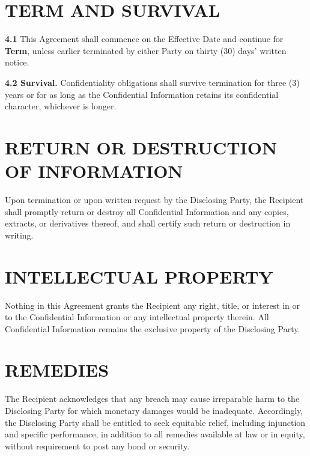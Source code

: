 \documentclass[10pt]{article}
\begin{document}
\section{TERM AND SURVIVAL}

\textbf{4.1} This Agreement shall commence on the Effective Date and continue for \textbf{{{Term}}}, unless earlier terminated by either Party on thirty (30) days' written notice.

\textbf{4.2 Survival.} Confidentiality obligations shall survive termination for three (3) years or for as long as the Confidential Information retains its confidential character, whichever is longer.

\section{RETURN OR DESTRUCTION OF INFORMATION}

Upon termination or upon written request by the Disclosing Party, the Recipient shall promptly return or destroy all Confidential Information and any copies, extracts, or derivatives thereof, and shall certify such return or destruction in writing.

\section{INTELLECTUAL PROPERTY}

Nothing in this Agreement grants the Recipient any right, title, or interest in or to the Confidential Information or any intellectual property therein. All Confidential Information remains the exclusive property of the Disclosing Party.

\section{REMEDIES}

The Recipient acknowledges that any breach may cause irreparable harm to the Disclosing Party for which monetary damages would be inadequate. Accordingly, the Disclosing Party shall be entitled to seek equitable relief, including injunction and specific performance, in addition to all remedies available at law or in equity, without requirement to post any bond or security.
\end{document}
